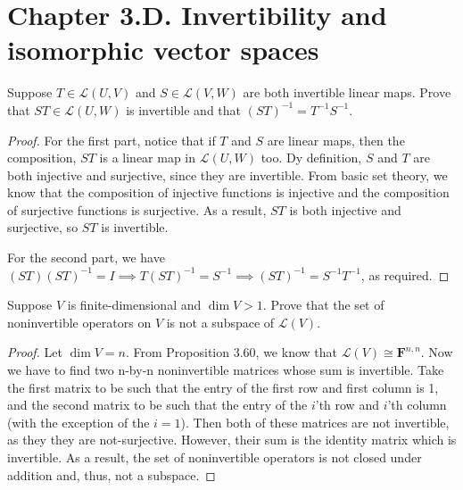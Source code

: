 \section*{Chapter 3.D. Invertibility and isomorphic vector spaces}


\begin{exercise}{1}
  Suppose $T\in\mathcal{L}(U,V)$ and $S\in\mathcal{L}(V,W)$ are both invertible linear maps. 
  Prove that $ST\in\mathcal{L}(U,W)$ is invertible and that $(ST)^{-1}=T^{-1}S^{-1}$.
\end{exercise}
\begin{proof}
 For the first part, notice that if $T$ and $S$ are linear maps, then the composition, $ST$ is a linear map in $\mathcal{L}(U,W)$ too. 
 Dy definition, $S$ and $T$ are both injective and surjective, since they are invertible. 
 From basic set theory, we know that the composition of injective functions is injective and the composition of surjective functions is surjective. 
 As a result, $ST$ is both injective and surjective, so $ST$ is invertible.
 
 For the second part, we have $(ST)(ST)^{-1}=I \implies T(ST)^{-1}=S^{-1} \implies (ST)^{-1}=S^{-1}T^{-1}$, as required.
\end{proof}


\begin{exercise}{2}
  Suppose $V$ is finite-dimensional and $\dim V>1$. Prove that the set of noninvertible operators on $V$ is not a subspace of $\mathcal{L}(V)$.
\end{exercise}
\begin{proof}
 Let $\dim V=n$. From Proposition 3.60, we know that $\mathcal{L}(V)\cong\mathbf{F}^{n,n}$. Now we have to find two n-by-n noninvertible matrices whose sum is invertible. Take the first matrix to be such that the entry of the first row and first column is 1, and the second matrix to be such that the entry of the $i$'th row and $i$'th column (with the exception of the $i=1$). Then both of these matrices are not invertible, as they they are not-surjective. However, their sum is the identity matrix which is invertible. As a result, the set of noninvertible operators is not closed under addition and, thus, not a subspace.
\end{proof}


